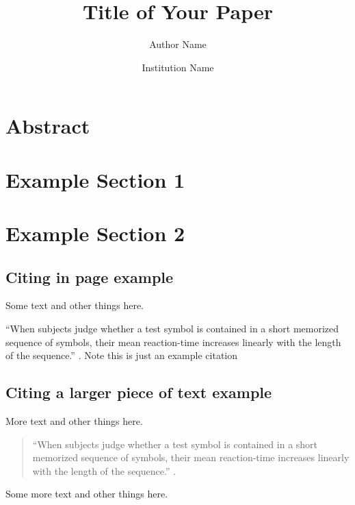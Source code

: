 \documentclass[letterpaper, 12pt, titlepage]{article}
\begin{document}
\title{{\myfont Title of Your Paper\vspace{-2.5ex}}}
\author{Author Name}
\date{Institution Name}
\maketitle
\newpage

\section*{\centering Abstract}
\blindtext[1]

\newpage

\section{Example Section 1}
\blindtext[1]

\blindtext[1]

\section{Example Section 2}
\subsection{Citing in page example}
Some text and other things here.

``When subjects judge whether a test symbol is contained in a short memorized
sequence of symbols, their mean reaction-time increases linearly with the length
of the sequence.'' \cite{sternberg1966high}.
Note this is just an example citation 

\subsection{Citing a larger piece of text example}

More text and other things here.
\begin{quote}
``When subjects judge whether a test symbol is contained in a short memorized
sequence of symbols, their mean reaction-time increases linearly with the length
of the sequence.'' \cite{sternberg1966high}.
  \end{quote}

Some more text and other things here.



\newpage




\end{document}
